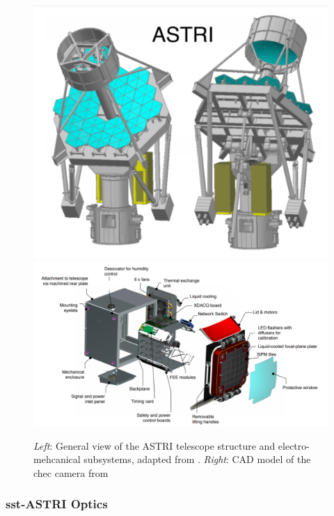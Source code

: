\documentclass[main.tex]{subfiles}
\begin{document}
    
\begin{figure}[!htb]
  \includegraphics[width=\linewidth]{Pictures/ASTRI.pdf}
  \endminipage\hfill
  \includegraphics[width=\linewidth]{Pictures/CHECcam.pdf}
  \endminipage\hfill
  \caption{\label{fig:SST} \textit{Left}: General view of the ASTRI telescope structure and electro-mehcanical subsystems, adapted from \cite{2013SSTstruct}. \textit{Right}: CAD model of the \gls{chec} camera from \cite{2017CHECcam} }
\end{figure}

\subsubsection{\gls{sst}-ASTRI Optics}
\end{document}
